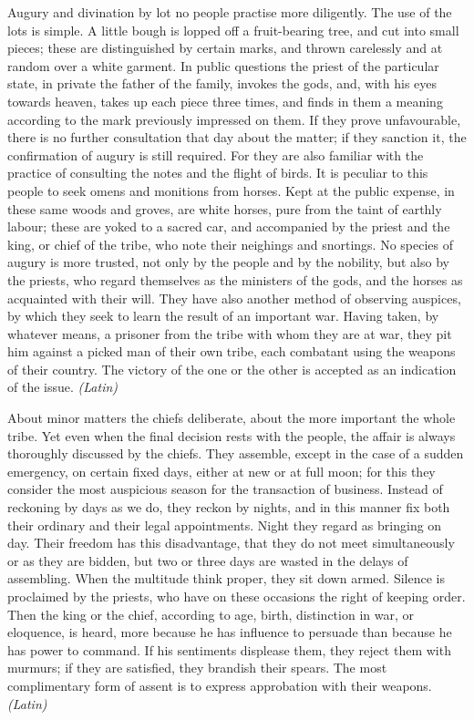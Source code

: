 Augury and divination by lot no people practise more diligently. The use of the lots is simple. A little bough is lopped off a fruit-bearing tree, and cut into small pieces; these are distinguished by certain marks, and thrown carelessly and at random over a white garment. In public questions the priest of the particular state, in private the father of the family, invokes the gods, and, with his eyes towards heaven, takes up each piece three times, and finds in them a meaning according to the mark previously impressed on them. If they prove unfavourable, there is no further consultation that day about the matter; if they sanction it, the confirmation of augury is still required. For they are also familiar with the practice of consulting the notes and the flight of birds. It is peculiar to this people to seek omens and monitions from horses. Kept at the public expense, in these same woods and groves, are white horses, pure from the taint of earthly labour; these are yoked to a sacred car, and accompanied by the priest and the king, or chief of the tribe, who note their neighings and snortings. No species of augury is more trusted, not only by the people and by the nobility, but also by the priests, who regard themselves as the ministers of the gods, and the horses as acquainted with their will. They have also another method of observing auspices, by which they seek to learn the result of an important war. Having taken, by whatever means, a prisoner from the tribe with whom they are at war, they pit him against a picked man of their own tribe, each combatant using the weapons of their country. The victory of the one or the other is accepted as an indication of the issue. \emph{(Latin)}


About minor matters the chiefs deliberate, about the more important the whole tribe. Yet even when the final decision rests with the people, the affair is always thoroughly discussed by the chiefs. They assemble, except in the case of a sudden emergency, on certain fixed days, either at new or at full moon; for this they consider the most auspicious season for the transaction of business. Instead of reckoning by days as we do, they reckon by nights, and in this manner fix both their ordinary and their legal appointments. Night they regard as bringing on day. Their freedom has this disadvantage, that they do not meet simultaneously or as they are bidden, but two or three days are wasted in the delays of assembling. When the multitude think proper, they sit down armed. Silence is proclaimed by the priests, who have on these occasions the right of keeping order. Then the king or the chief, according to age, birth, distinction in war, or eloquence, is heard, more because he has influence to persuade than because he has power to command. If his sentiments displease them, they reject them with murmurs; if they are satisfied, they brandish their spears. The most complimentary form of assent is to express approbation with their weapons. \emph{(Latin)}


